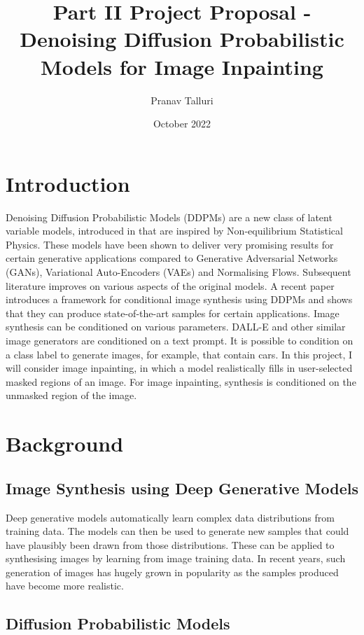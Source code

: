 \documentclass{article}
\title{Part II Project Proposal - Denoising Diffusion Probabilistic Models for Image Inpainting}
\author{Pranav Talluri}
\date{October 2022}
\begin{document}
\maketitle
\tableofcontents
\newpage

\section{Introduction}

Denoising Diffusion Probabilistic Models (DDPMs) are a new class of latent variable models, introduced in \cite{Sohl-Dickstein-2015} that are inspired by Non-equilibrium Statistical Physics. These models have been shown to deliver very promising results for certain generative applications compared to Generative Adversarial Networks (GANs), Variational Auto-Encoders (VAEs) and Normalising Flows. Subsequent literature improves on various aspects of the original models. A recent paper \parencite{Saharia-2022} introduces a framework for conditional image synthesis using DDPMs and shows that they can produce state-of-the-art samples for certain applications.
Image synthesis can be conditioned on various parameters. DALL-E and other similar image generators are conditioned on a text prompt. It is possible to condition on a class label to generate images, for example, that contain cars. In this project, I will consider image inpainting, in which a model realistically fills in user-selected masked regions of an image. For image inpainting, synthesis is conditioned on the unmasked region of the image.

\section{Background}

\subsection{Image Synthesis using Deep Generative Models}

Deep generative models automatically learn complex data distributions from training data. The models can then be used to generate new samples that could have plausibly been drawn from those distributions. These can be applied to synthesising images by learning from image training data. In recent years, such generation of images has hugely grown in popularity as the samples produced have become more realistic.

\subsection{Diffusion Probabilistic Models}
\end{document}
